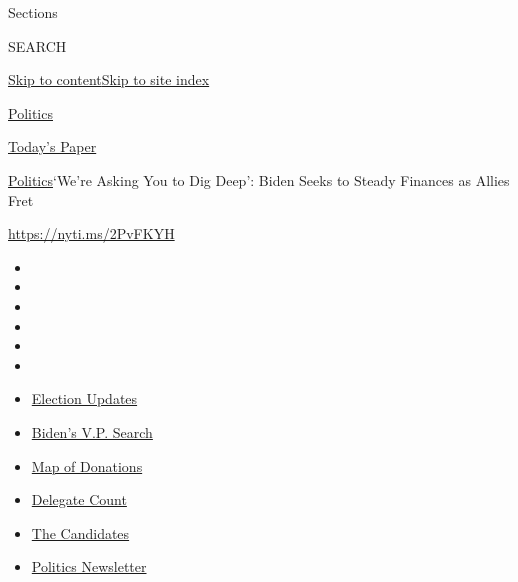 Sections

SEARCH

\protect\hyperlink{site-content}{Skip to
content}\protect\hyperlink{site-index}{Skip to site index}

\href{https://www.nytimes.com/section/politics}{Politics}

\href{https://myaccount.nytimes.com/auth/login?response_type=cookie\&client_id=vi}{}

\href{https://www.nytimes.com/section/todayspaper}{Today's Paper}

\href{/section/politics}{Politics}\textbar{}`We're Asking You to Dig
Deep': Biden Seeks to Steady Finances as Allies Fret

\url{https://nyti.ms/2PvFKYH}

\begin{itemize}
\item
\item
\item
\item
\item
\item
\end{itemize}

\begin{itemize}
\item
  \href{https://www.nytimes.com/2020/07/31/us/elections/biden-vs-trump.html?action=click\&pgtype=Article\&state=default\&region=TOP_BANNER\&context=storylines_menu}{Election
  Updates}
\item
  \href{https://www.nytimes.com/article/biden-vice-president-2020.html?action=click\&pgtype=Article\&state=default\&region=TOP_BANNER\&context=storylines_menu}{Biden's
  V.P. Search}
\item
  \href{https://www.nytimes.com/interactive/2020/07/24/us/politics/trump-biden-campaign-donors.html?action=click\&pgtype=Article\&state=default\&region=TOP_BANNER\&context=storylines_menu}{Map
  of Donations}
\item
  \href{https://www.nytimes.com/interactive/2020/us/elections/delegate-count-primary-results.html?action=click\&pgtype=Article\&state=default\&region=TOP_BANNER\&context=storylines_menu}{Delegate
  Count}
\item
  \href{https://www.nytimes.com/interactive/2019/us/politics/2020-presidential-candidates.html?action=click\&pgtype=Article\&state=default\&region=TOP_BANNER\&context=storylines_menu}{The
  Candidates}
\item
  \href{https://www.nytimes.com/newsletters/politics?action=click\&pgtype=Article\&state=default\&region=TOP_BANNER\&context=storylines_menu}{Politics
  Newsletter}
\end{itemize}

